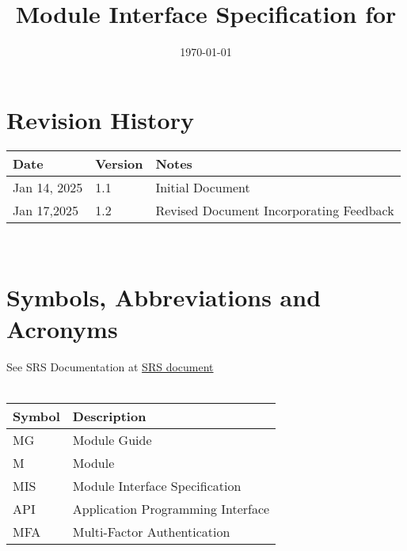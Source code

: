\documentclass[12pt, titlepage]{article}
\begin{document}
\title{Module Interface Specification for \progname{}}

\author{\authname}

\date{\today}

\maketitle


\section{Revision History}

\begin{tabularx}{\textwidth}{p{3cm}p{2cm}X}
\toprule {\bf Date} & {\bf Version} & {\bf Notes}\\
\midrule
Jan 14, 2025 & 1.1 & Initial Document\\
Jan 17,2025 & 1.2 & Revised Document Incorporating Feedback\\

\bottomrule
\end{tabularx}

~\newpage

\section{Symbols, Abbreviations and Acronyms}

See SRS Documentation at \href{https://github.com/Inreet-Kaur/capstone/blob/main/docs/SRS/SRS.pdf} {SRS document}\\
\\


\begin{tabularx}{\textwidth}{p{2cm}X}
  \toprule
  {\bf Symbol} & {\bf Description}                                                                                     \\
  \midrule
  MG           & Module Guide                                                                                          \\
  M            & Module                                                                                                \\
  MIS          & Module Interface Specification                                                                        \\
  API          & Application Programming Interface                                                                     \\
  MFA          & Multi-Factor Authentication                                                                           \\
  \bottomrule
\end{tabularx}
\end{document}
